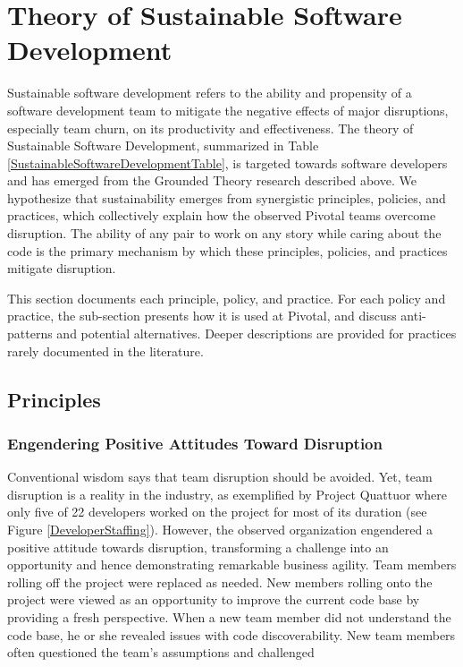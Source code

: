 \section{Theory of Sustainable Software Development}
\label{Theory}

Sustainable software development refers to the ability and propensity of a software development team to mitigate the negative effects of major disruptions, especially team churn, on its productivity and effectiveness. The theory of Sustainable Software Development, summarized in Table \ref{SustainableSoftwareDevelopmentTable}, is targeted towards software developers and has emerged from the Grounded Theory research described above. We hypothesize that sustainability emerges from synergistic principles, policies, and practices, which collectively explain how the observed Pivotal teams overcome disruption. The ability of any pair to work on any story while caring about the code is the primary mechanism by which these principles, policies, and practices mitigate disruption. 

This section documents each principle, policy, and practice. For each policy and practice, the sub-section presents how it is used at Pivotal, and discuss anti-patterns and potential alternatives. Deeper descriptions are provided for practices rarely documented in the literature.
\subsection{Principles}

\subsubsection{Engendering Positive Attitudes Toward Disruption}
Conventional wisdom says that team disruption should be avoided. Yet, team disruption is a reality in the industry, as exemplified by Project Quattuor where only five of 22 developers worked on the project for most of its duration (see Figure \ref{DeveloperStaffing}). However, the observed organization engendered a positive attitude towards disruption, transforming a challenge into an opportunity and hence demonstrating remarkable business agility. Team members rolling off the project were replaced as needed. New members rolling onto the project were viewed as an opportunity to improve the current code base by providing a fresh perspective. When a new team member did not understand the code base, he or she revealed issues with code discoverability. New team members often questioned the team's assumptions and challenged  

